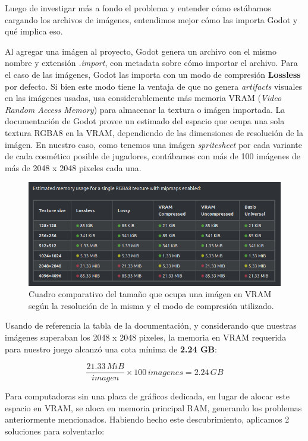Luego de investigar más a fondo el problema y entender cómo estábamos cargando los archivos de imágenes,
entendimos mejor cómo las importa Godot y qué implica eso.

Al agregar una imágen al proyecto, Godot genera un archivo con el mismo nombre y extensión 
\textit{.import}, con metadata sobre cómo importar el archivo. Para el caso de las imágenes, 
Godot las importa con un modo de compresión \textbf{Lossless} por defecto. Si bien este modo
tiene la ventaja de que no genera \textit{artifacts} visuales en las imágenes usadas, usa 
considerablemente más memoria VRAM (\textit{Video Random Access Memory}) para almacenar la textura o
imágen importada. La documentación de Godot\cite{ref2} provee un estimado del espacio que ocupa una sola textura
RGBA8 en la VRAM, dependiendo de las dimensiones de resolución de la imágen. En nuestro caso, como
tenemos una imágen \textit{spritesheet} por cada variante de cada cosmético posible de jugadores,
contábamos con más de 100 imágenes de más de 2048 x 2048 pixeles cada una. 

\begin{figure}[htbp]
    \centering
    \includegraphics[width=1.0\textwidth]{../assets/godot-docs-images.png}
    \caption{Cuadro comparativo del tamaño que ocupa una imágen en VRAM según la resolución
             de la misma y el modo de compresión utilizado.}
\end{figure}

Usando de referencia la tabla de la documentación, y considerando que nuestras imágenes superaban
los 2048 x 2048 pixeles, la memoria en VRAM requerida para nuestro juego alcanzó una cota mínima de 
\textbf{2.24 GB}:

\[
\frac{21.33 \, MiB}{imagen} \times 100 \, imagenes = 2.24 \, GB
\]

Para computadoras sin una placa de gráficos dedicada, en lugar de alocar este espacio en VRAM,
se aloca en memoria principal RAM, generando los problemas anteriormente mencionados.
Habiendo hecho este descubrimiento, aplicamos 2 soluciones para solventarlo:

